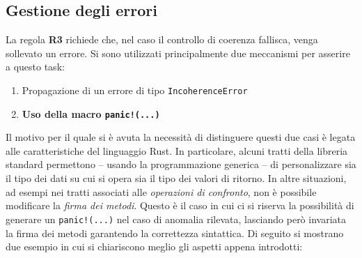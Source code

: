 \subsection{Gestione degli errori}
La regola \textbf{R3} richiede che, nel caso il controllo di coerenza fallisca, venga sollevato un errore. Si sono utilizzati principalmente due meccanismi per asserire a questo task:
\begin{enumerate}
    \item Propagazione di un errore di tipo \texttt{IncoherenceError} 
    \item \textbf{Uso della macro \texttt{panic!(...)}}
\end{enumerate}
Il motivo per il quale si è avuta la necessità di distinguere questi due casi è legata alle caratteristiche del linguaggio Rust. In particolare, alcuni tratti della libreria standard permettono -- usando la programmazione generica -- di personalizzare sia il tipo dei dati su cui si opera sia il tipo dei valori di ritorno. In altre situazioni, ad esempi nei tratti associati alle \textit{operazioni di confronto}, non è possibile modificare la \textit{firma dei metodi}. Questo è il caso in cui ci si riserva la possibilità di generare un \texttt{panic!(...)} nel caso di anomalia rilevata, lasciando però invariata la firma dei metodi garantendo la correttezza sintattica.
Di seguito si mostrano due esempio in cui si chiariscono meglio gli aspetti appena introdotti:
 

